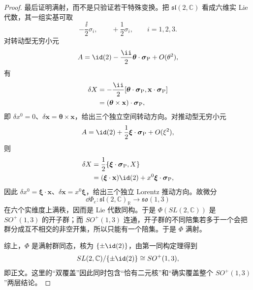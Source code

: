 \begin{proof}
最后证明满射，而不是只验证若干特殊变换。把 $\mathfrak{sl}(2,\mathbb C)$ 看成六维实 Lie 代数，其一组实基可取
\begin{equation*}
 -\frac{\ii}{2}\sigma_i,
 \qquad
 +\frac12\sigma_i,
 \qquad i=1,2,3.
\end{equation*}
对转动型无穷小元
\begin{equation*}
 A=\id(2)-\frac{\ii}{2}\boldsymbol\theta\cdot\boldsymbol\sigma_{\rm P}
 +O(\theta^2),
\end{equation*}
有
\begin{align*}
 \delta X
 &=-\frac{\ii}{2}
 [\boldsymbol\theta\cdot\boldsymbol\sigma_{\rm P},
   \mathbf x\cdot\boldsymbol\sigma_{\rm P}]\\
 &=(\boldsymbol\theta\times\mathbf x)\cdot\boldsymbol\sigma_{\rm P},
\end{align*}
即 $\delta x^0=0$、$\delta\mathbf x=\boldsymbol\theta\times\mathbf x$，给出三个独立空间转动方向。对推动型无穷小元
\begin{equation*}
 A=\id(2)+\frac12\boldsymbol\xi\cdot\boldsymbol\sigma_{\rm P}
 +O(\xi^2),
\end{equation*}
则
\begin{align*}
 \delta X
 &=\frac12\{\boldsymbol\xi\cdot\boldsymbol\sigma_{\rm P},X\}\\
 &=(\boldsymbol\xi\cdot\mathbf x)\id(2)
 +x^0\boldsymbol\xi\cdot\boldsymbol\sigma_{\rm P},
\end{align*}
因此 $\delta x^0=\boldsymbol\xi\cdot\mathbf x$、$\delta\mathbf x=x^0\boldsymbol\xi$，给出三个独立 Lorentz 推动方向。故微分
\begin{equation*}
 \dd\Phi_e:\mathfrak{sl}(2,\mathbb C)_{\mathbb R}
 \longrightarrow\mathfrak{so}(1,3)
\end{equation*}
在六个实维度上满秩，因而是 Lie 代数同构。于是 $\Phi(SL(2,\mathbb C))$ 是 $SO^+(1,3)$ 的开子群；而 $SO^+(1,3)$ 连通，开子群的不同陪集若多于一个会把群分成互不相交的非空开集，所以只能有一个陪集。于是 $\Phi$ 满射。

综上，$\Phi$ 是满射群同态，核为 $\{\pm\id(2)\}$，由第一同构定理得到
\begin{equation*}
 SL(2,\mathbb C)/\{\pm\id(2)\}
 \cong SO^+(1,3),
\end{equation*}
即正文。这里的“双覆盖”因此同时包含“恰有二元核”和“确实覆盖整个 $SO^+(1,3)$”两层结论。
\end{proof}

